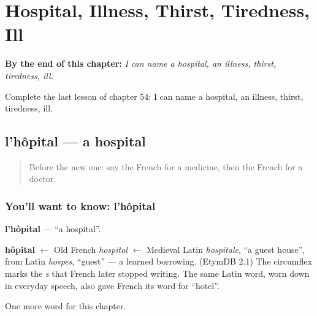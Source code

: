 
\chapter{Hospital, Illness, Thirst, Tiredness, Ill}
\label{ch:fr-hospital-illness-thirst-tiredness-ill}

\begin{chapteropening}
\textbf{By the end of this chapter:} \emph{I can name a hospital, an illness, thirst, tiredness, ill.}

Complete the last lesson of chapter 54: I can name a hospital, an illness, thirst, tiredness, ill.
\end{chapteropening}

\section[l'hôpital]{l'hôpital — a hospital}

\label{lesson:FR-C54-hopital}



\begin{quote}
Before the new one: say the French for a medicine, then the French for a doctor.
\end{quote}

\subsection*{You'll want to know: l'hôpital}
\textbf{l'hôpital} — \textquotedblleft{}a hospital\textquotedblright{}.

\begin{cousinweb}
\textbf{hôpital} $\leftarrow$ Old French \emph{hospital} $\leftarrow$ Medieval Latin \emph{hospitale}, \textquotedblleft{}a guest house\textquotedblright{}, from Latin \emph{hospes}, \textquotedblleft{}guest\textquotedblright{} — a learned borrowing. (EtymDB 2.1) The circumflex marks the \emph{s} that French later stopped writing. The same Latin word, worn down in everyday speech, also gave French its word for \textquotedblleft{}hotel\textquotedblright{}.
\end{cousinweb}

\begin{grammarlens}[title={What you've built}]
One more word for this chapter.
\end{grammarlens}

